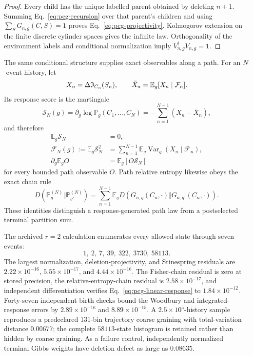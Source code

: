 \begin{proof}
Every child has the unique labelled parent obtained by deleting \(n+1\).
Summing Eq.~\eqref{eq:pcg-recursion} over that parent's children and using
\(\sum_SG_{n,g}(C,S)=1\) proves
Eq.~\eqref{eq:pcg-projectivity}.  Kolmogorov extension on the finite
discrete cylinder spaces gives the infinite law.  Orthogonality of the
environment labels and conditional normalization imply
\(V_{n,g}^\dagger V_{n,g}=\mathbf1\).
\end{proof}

The same conditional structure supplies exact observables along a path.
For an \(N\)-event history, let
\[
 X_n=\Delta\mathfrak I_{C_n}(S_n),\qquad
 \bar X_n=\mathbb E_g[X_n\mid\mathcal F_n].
\]
Its response score is the martingale
\begin{equation}
 \mathcal S_N(g)=\partial_g\log\mathbb P_g(C_1,\ldots,C_N)
 =-\sum_{n=1}^{N-1}(X_n-\bar X_n),
 \label{eq:pcg-score}
\end{equation}
and therefore
\begin{align}
 \mathbb E_g\mathcal S_N&=0,\nonumber\\
 \mathcal F_N(g):=\mathbb E_g\mathcal S_N^2
 &=\sum_{n=1}^{N-1}
 \mathbb E_g\operatorname{Var}_g(X_n\mid\mathcal F_n),\label{eq:pcg-fisher}\\
 \partial_g\mathbb E_g O&=\mathbb E_g[O\mathcal S_N]
 \label{eq:pcg-linear-response}
\end{align}
for every bounded path observable \(O\).  Path relative entropy likewise
obeys the exact chain rule
\begin{equation}
 D(\mathbb P_g^{(N)}\Vert\mathbb P_{g'}^{(N)})
 =\sum_{n=1}^{N-1}
 \mathbb E_gD(G_{n,g}(C_n,\cdot)\Vert
 G_{n,g'}(C_n,\cdot)).
 \label{eq:pcg-kl-chain}
\end{equation}
These identities distinguish a response-generated path law from a
postselected terminal partition sum.

The archived \(r=2\) calculation enumerates every allowed state through
seven events:
\[
 1,\ 2,\ 7,\ 39,\ 322,\ 3730,\ 58113.
\]
The largest normalization, deletion-projectivity, and Stinespring residuals
are \(2.22\times10^{-16}\), \(5.55\times10^{-17}\), and
\(4.44\times10^{-16}\).  The Fisher-chain residual is zero at stored
precision, the relative-entropy-chain residual is
\(2.58\times10^{-17}\), and independent differentiation verifies
Eq.~\eqref{eq:pcg-linear-response} to \(1.84\times10^{-12}\).  Forty-seven
independent birth checks bound the Woodbury and integrated-response errors
by \(2.89\times10^{-16}\) and \(8.89\times10^{-15}\).  A
\(2.5\times10^5\)-history sample reproduces a predeclared 131-bin
trajectory coarse graining with total-variation distance \(0.00677\);
the complete \(58113\)-state histogram is retained rather than hidden by
coarse graining.  As a failure control, independently normalized terminal
Gibbs weights have deletion defect as large as \(0.08635\).


